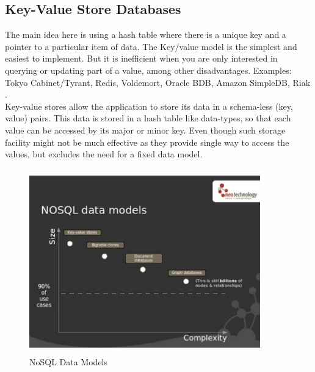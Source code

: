 \subsection{Key-Value Store Databases}
\hspace*{0.7in} The main idea here is using a hash table where there is a unique key and a pointer to a particular item of data. The Key/value model is the simplest and easiest to implement. But it is inefficient when you are only interested in querying or updating part of a value, among other disadvantages. Examples: Tokyo Cabinet/Tyrant, Redis, Voldemort, Oracle BDB, Amazon SimpleDB, Riak \cite{8}.
\\
\hspace*{0.7in} Key-value stores allow the application to store its data in a schema-less (key, value) pairs. This data is stored in a hash table like data-types, so that each value can be accessed by its major or minor key. Even though such storage facility might not be much effective as they provide single way to access the values, but excludes the need for a fixed data model.
\\
\begin{figure}[h]
\centering
  \includegraphics[width=10cm,height=8cm]{L4.jpg}
  \caption{NoSQL Data Models}\label{NoSQL Data Models}
\end{figure}
\\

